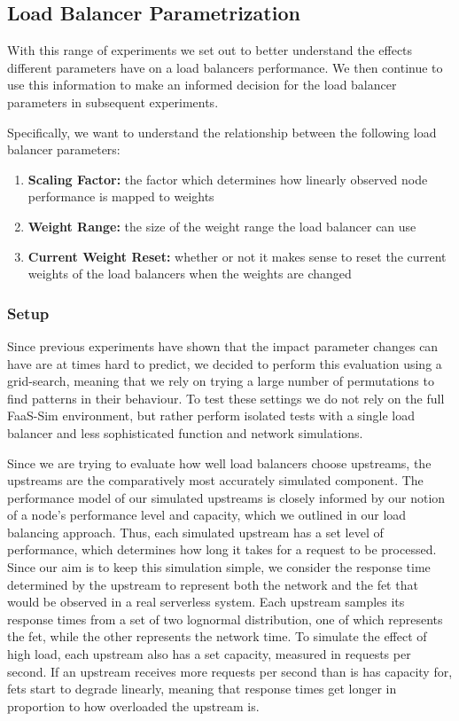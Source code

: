 \subsection{Load Balancer Parametrization}
With this range of experiments we set out to better understand the effects different parameters have on a load balancers performance.
We then continue to use this information to make an informed decision for the load balancer parameters in subsequent experiments.

Specifically, we want to understand the relationship between the following load balancer parameters:
\begin{enumerate}
    \item \textbf{Scaling Factor:} the factor which determines how linearly observed node performance is mapped to weights
    \item \textbf{Weight Range:} the size of the weight range the load balancer can use
    \item \textbf{Current Weight Reset:} whether or not it makes sense to reset the current weights of the load balancers when the weights are changed
\end{enumerate}

\subsubsection{Setup}

Since previous experiments have shown that the impact parameter changes can have are at times hard to predict, we decided to perform this evaluation using a grid-search, meaning that we rely on trying a large number of permutations to find patterns in their behaviour.
To test these settings we do not rely on the full FaaS-Sim environment, but rather perform isolated tests with a single load balancer and less sophisticated function and network simulations.

Since we are trying to evaluate how well load balancers choose upstreams, the upstreams are the comparatively most accurately simulated component.
The performance model of our simulated upstreams is closely informed by our notion of a node's performance level and capacity, which we outlined in our load balancing approach.
Thus, each simulated upstream has a set level of performance, which determines how long it takes for a request to be processed.
Since our aim is to keep this simulation simple, we consider the response time determined by the upstream to represent both the network and the \gls{fet} that would be observed in a real serverless system.
Each upstream samples its response times from a set of two lognormal distribution, one of which represents the \gls{fet}, while the other represents the network time.
To simulate the effect of high load, each upstream also has a set capacity, measured in requests per second.
If an upstream receives more requests per second than is has capacity for, \glspl{fet} start to degrade linearly, meaning that response times get longer in proportion to how overloaded the upstream is.

